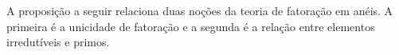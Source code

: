 %

A proposição a seguir relaciona duas noções da teoria de fatoração em anéis. A primeira é a unicidade de fatoração e a segunda é a relação entre elementos irredutíveis e primos.

